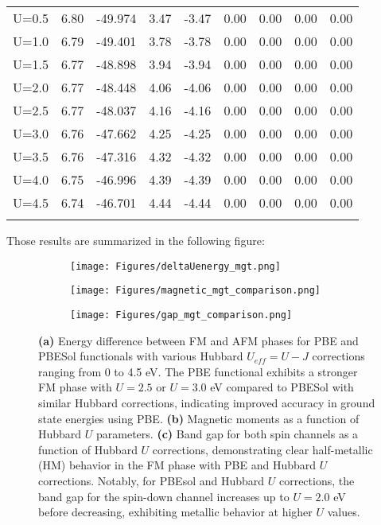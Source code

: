 \begin{table}[H]
\begin{tabular}{cccccc|ccc}
		U=0.5 & 6.80 & -49.974 & 3.47 & -3.47 & 0.00 & 0.00 & 0.00 & 0.00 \\
		U=1.0 & 6.79 & -49.401 & 3.78 & -3.78 & 0.00 & 0.00 & 0.00 & 0.00 \\
		U=1.5 & 6.77 & -48.898 & 3.94 & -3.94 & 0.00 & 0.00 & 0.00 & 0.00 \\
		U=2.0 & 6.77 & -48.448 & 4.06 & -4.06 & 0.00 & 0.00 & 0.00 & 0.00 \\
		U=2.5 & 6.77 & -48.037 & 4.16 & -4.16 & 0.00 & 0.00 & 0.00 & 0.00 \\
		U=3.0 & 6.76 & -47.662 & 4.25 & -4.25 & 0.00 & 0.00 & 0.00 & 0.00 \\
		U=3.5 & 6.76 & -47.316 & 4.32 & -4.32 & 0.00 & 0.00 & 0.00 & 0.00 \\
		U=4.0 & 6.75 & -46.996 & 4.39 & -4.39 & 0.00 & 0.00 & 0.00 & 0.00 \\
		U=4.5 & 6.74 & -46.701 & 4.44 & -4.44 & 0.00 & 0.00 & 0.00 & 0.00 \\
		\bottomrule
		\bottomrule
		\label{tab:4.8}
	\end{tabular}
\end{table}

Those results are summarized in the following figure:

\begin{figure}[H]
	\centering
	\begin{subfigure}{.50\textwidth}
		\centering
		\texttt{[image: Figures/deltaUenergy\_mgt.png]}
	\end{subfigure}%
	\hfill %
	\begin{subfigure}{.50\textwidth}
		\centering
		\texttt{[image: Figures/magnetic\_mgt\_comparison.png]}
	\end{subfigure}
	
	\begin{subfigure}{.60\textwidth}
		\centering
		\texttt{[image: Figures/gap\_mgt\_comparison.png]}
	\end{subfigure}
	\caption{\textbf{(a)} Energy difference between FM and AFM phases for PBE and PBESol functionals with various Hubbard $U_{eff} = U - J$ corrections ranging from 0 to 4.5 eV. The PBE functional exhibits a stronger FM phase with $U=2.5$ or $U=3.0$ eV compared to PBESol with similar Hubbard corrections, indicating improved accuracy in ground state energies using PBE. \textbf{(b)} Magnetic moments as a function of Hubbard $U$ parameters. \textbf{(c)} Band gap for both spin channels as a function of Hubbard $U$ corrections, demonstrating clear half-metallic (HM) behavior in the FM phase with PBE and Hubbard $U$ corrections. Notably, for PBEsol and Hubbard $U$ corrections, the band gap for the spin-down channel increases up to $U=2.0$ eV before decreasing, exhibiting metallic behavior at higher $U$ values.}
	\label{fig:4.13}
\end{figure}

